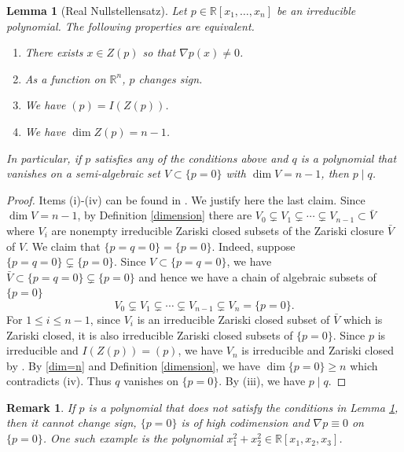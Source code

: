 \documentclass[pdflatex,sn-mathphys-num]{sn-jnl}%
\theoremstyle{thmstyleone}%
\newtheorem{lemma}[theorem]{Lemma}
\theoremstyle{thmstyletwo}%
\newtheorem{remark}{Remark}%
\theoremstyle{thmstylethree}%
\newcommand{\R}{\mathbb{R}}
\begin{document}
\begin{lemma}[Real Nullstellensatz]\label{null}
	Let $p\in \R[x_1,\dots,x_n]$ be an irreducible polynomial. The following properties are equivalent.
	\begin{enumerate}
		\item[(i)]   There exists $x\in Z(p)$ so that $\nabla p(x)\neq 0$. 
		
		\item[(ii)]  As a function on $\R^n$, $p$ changes sign. 
		
		\item[(iii)]  We have $(p)=I(Z(p))$.
		
		\item[(iv)]  We have $\dim Z(p)=n-1$.
	\end{enumerate}
	
	In particular, if $p$ satisfies any of the conditions above and $q$ is a polynomial that vanishes on a semi-algebraic set $V\subset \{p=0\}$ with $\dim V=n-1$, then $p\mid q$.
\end{lemma}
\begin{proof}
	Items (i)-(iv) can be found in \cite[Theorem 4.5.1]{bochnak2013real}. We justify here the last claim. Since $\dim V=n-1$, by Definition \ref{dimension} there are $V_0\subsetneq V_1\subsetneq\cdots\subsetneq V_{n-1}\subset \bar V$ where $V_i$ are nonempty irreducible Zariski closed subsets of the Zariski closure $\bar V$ of $V$. We claim that $\{p=q=0\}=\{p=0\}$. Indeed, suppose $\{p=q=0\}\subsetneq \{p=0\}$. Since $V\subset \{p=q=0\}$, we have $\bar V\subset \{p=q=0\}\subsetneq \{p=0\}$ and hence we have a chain of algebraic subsets of $\{p=0\}$
    \begin{equation}\label{dim=n}
	    V_0\subsetneq  V_1\subsetneq\cdots\subsetneq V_{n-1}\subsetneq V_n=\{p=0\}.
	\end{equation} For $1\le i\le n-1$, since $V_i$ is an irreducible Zariski closed subset of $\bar V$ which is Zariski closed, it is also irreducible Zariski closed subsets of $\{p=0\}$. Since $p$ is irreducible and $I(Z(p))=(p)$, we have $V_n$ is irreducible and Zariski closed by \cite[Theorem 2.8.3]{bochnak2013real}. By \eqref{dim=n} and Definition \ref{dimension}, we have $\dim\{p=0\}\ge  n$ which contradicts (iv). Thus $q$ vanishes on $\{p=0\}$. By (iii), we have $p\mid q$.
\end{proof}

\begin{remark}
	If $p$ is a polynomial that does not satisfy the conditions in Lemma \ref{null}, then it cannot change sign, $\{p=0\}$ is of high codimension and $\nabla p\equiv0$ on $\{p=0\}$. One such example is the polynomial $x_1^2+x_2^2\in \R[x_1,x_2,x_3]$.
\end{remark}
\end{document}
